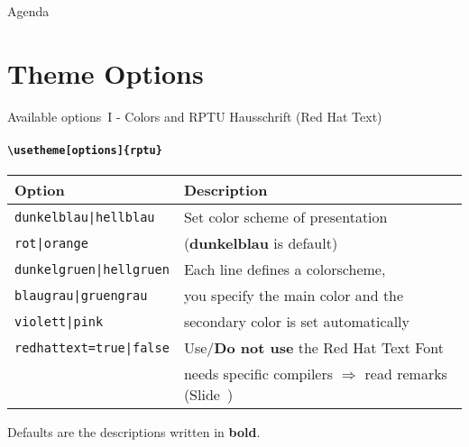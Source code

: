 \begin{frame}
	\titlepage
\end{frame}

\begin{frame}{Agenda}
	\tableofcontents
\end{frame}

\section{Theme Options}
\rptusectionpage

\begin{frame}{Available options~I - Colors and RPTU Hausschrift (Red Hat Text)}
	\framesubtitle{\texttt{\textbackslash usetheme[options]\{rptu\}}}
	\begin{tabular}{ll}
		\textbf{Option} & \textbf{Description}\\ \toprule
		\texttt{dunkelblau|hellblau} & Set color scheme of presentation\\
		\texttt{rot|orange} & (\textbf{dunkelblau} is default)\\
		\texttt{dunkelgruen|hellgruen} & Each line defines a colorscheme,\\
		\texttt{blaugrau|gruengrau} & you specify the main color and the\\ 
		\texttt{violett|pink} & secondary color is set automatically\\ \midrule		\texttt{redhattext=true|false} & Use/\textbf{Do not use} the Red Hat Text Font \\ & needs specific compilers $\Rightarrow$ read remarks (Slide~\pageref{remarks-font}) \\\bottomrule
	\end{tabular}
	\vspace*{2ex}
	
	Defaults are the descriptions written in \textbf{bold}.
\end{frame}


